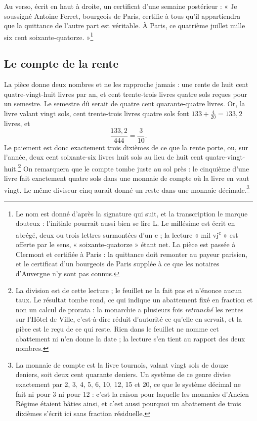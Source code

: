 \documentclass[11pt,a4paper]{article}
\begin{document}
Au verso, écrit en haut à droite, un certificat d'une semaine postérieur :
« Je soussigné Antoine Ferret, bourgeois de Paris, certifie à tous qu'il
appartiendra que la quittance de l'autre part est véritable. À Paris, ce
quatrième juillet mille six cent soixante-quatorze. »\footnote{Le nom est
donné d'après la signature qui suit, et la transcription le marque douteux :
l'initiale pourrait aussi bien se lire L. Le millésime est écrit en abrégé,
deux ou trois lettres surmontées d'un c ; la lecture « mil vj\textsuperscript{c} »
est offerte par le sens, « soixante-quatorze » étant net. La pièce est passée
à Clermont et certifiée à Paris : la quittance doit remonter au payeur
parisien, et le certificat d'un bourgeois de Paris supplée à ce que les
notaires d'Auvergne n'y sont pas connus.}

\subsection*{Le compte de la rente}

La pièce donne deux nombres et ne les rapproche jamais : une rente de huit
cent quatre-vingt-huit livres par an, et cent trente-trois livres quatre sols
reçues pour un semestre. Le semestre dû serait de quatre cent quarante-quatre
livres. Or, la livre valant vingt sols, cent trente-trois livres quatre sols
font $133 + \tfrac{4}{20} = 133{,}2$ livres, et
\[
\frac{133{,}2}{444} = \frac{3}{10}.
\]
Le paiement est donc exactement trois dixièmes de ce que la rente porte, ou,
sur l'année, deux cent soixante-six livres huit sols au lieu de huit cent
quatre-vingt-huit.\footnote{La division est de cette lecture ; le feuillet ne
la fait pas et n'énonce aucun taux. Le résultat tombe rond, ce qui indique un
abattement fixé en fraction et non un calcul de prorata : la monarchie a
plusieurs fois \emph{retranché} les rentes sur l'Hôtel de Ville, c'est-à-dire
réduit d'autorité ce qu'elle en servait, et la pièce est le reçu de ce qui
reste. Rien dans le feuillet ne nomme cet abattement ni n'en donne la date ;
la lecture s'en tient au rapport des deux nombres.} On remarquera que le
compte tombe juste au sol près : le cinquième d'une livre fait exactement
quatre sols dans une monnaie de compte où la livre en vaut vingt. Le même
diviseur cinq aurait donné un reste dans une monnaie décimale.\footnote{La
monnaie de compte est la livre tournois, valant vingt sols de douze deniers,
soit deux cent quarante deniers. Un système de ce genre divise exactement par
2, 3, 4, 5, 6, 10, 12, 15 et 20, ce que le système décimal ne fait ni pour 3
ni pour 12 : c'est la raison pour laquelle les monnaies d'Ancien Régime
étaient bâties ainsi, et c'est aussi pourquoi un abattement de trois dixièmes
s'écrit ici sans fraction résiduelle.}
\end{document}
